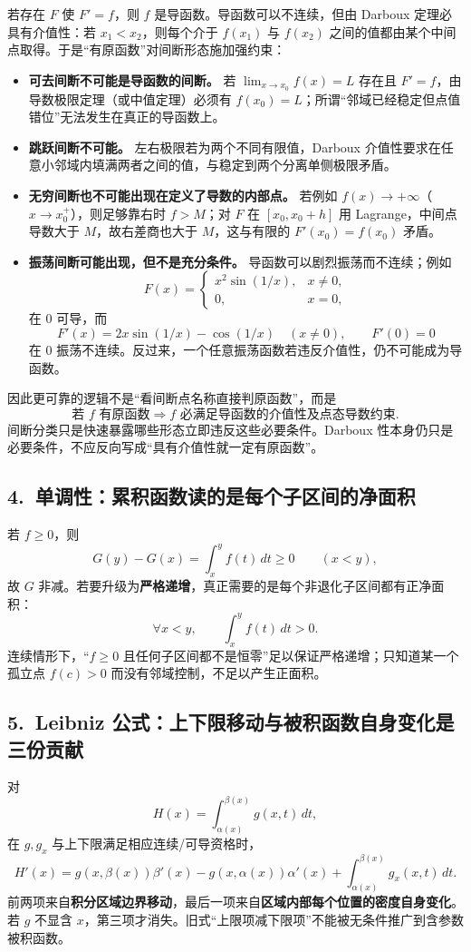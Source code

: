 \documentclass[UTF8,a4paper,10pt]{ctexart}
\begin{document}
若存在 $F$ 使 $F'=f$，则 $f$ 是导函数。导函数可以不连续，但由 Darboux 定理必具有介值性：若 $x_1<x_2$，则每个介于 $f(x_1)$ 与 $f(x_2)$ 之间的值都由某个中间点取得。于是“有原函数”对间断形态施加强约束：
\begin{itemize}
  \item \textbf{可去间断不可能是导函数的间断。} 若 $\lim_{x\to x_0}f(x)=L$ 存在且 $F'=f$，由导数极限定理（或中值定理）必须有 $f(x_0)=L$；所谓“邻域已经稳定但点值错位”无法发生在真正的导函数上。
  \item \textbf{跳跃间断不可能。} 左右极限若为两个不同有限值，Darboux 介值性要求在任意小邻域内填满两者之间的值，与稳定到两个分离单侧极限矛盾。
  \item \textbf{无穷间断也不可能出现在定义了导数的内部点。} 若例如 $f(x)\to+\infty$（$x\to x_0^+$），则足够靠右时 $f>M$；对 $F$ 在 $[x_0,x_0+h]$ 用 Lagrange，中间点导数大于 $M$，故右差商也大于 $M$，这与有限的 $F'(x_0)=f(x_0)$ 矛盾。
  \item \textbf{振荡间断可能出现，但不是充分条件。} 导函数可以剧烈振荡而不连续；例如
  \[
  F(x)=\begin{cases}x^2\sin(1/x),&x\ne0,\\0,&x=0,\end{cases}
  \]
  在 $0$ 可导，而
  \[
  F'(x)=2x\sin(1/x)-\cos(1/x)\quad(x\ne0),\qquad F'(0)=0
  \]
  在 $0$ 振荡不连续。反过来，一个任意振荡函数若违反介值性，仍不可能成为导函数。
\end{itemize}

因此更可靠的逻辑不是“看间断点名称直接判原函数”，而是
\[
\boxed{\text{若 }f\text{ 有原函数}\Longrightarrow f\text{ 必满足导函数的介值性及点态导数约束}.}
\]
间断分类只是快速暴露哪些形态立即违反这些必要条件。Darboux 性本身仍只是必要条件，不应反向写成“具有介值性就一定有原函数”。

\subsection*{4.\ 单调性：累积函数读的是每个子区间的净面积}
若 $f\ge0$，则
\[
G(y)-G(x)=\int_x^y f(t)\,dt\ge0\qquad(x<y),
\]
故 $G$ 非减。若要升级为\textbf{严格递增}，真正需要的是每个非退化子区间都有正净面积：
\[
\forall x<y,\qquad \int_x^y f(t)\,dt>0.
\]
连续情形下，“$f\ge0$ 且任何子区间都不是恒零”足以保证严格递增；只知道某一个孤立点 $f(c)>0$ 而没有邻域控制，不足以产生正面积。

\subsection*{5.\ Leibniz 公式：上下限移动与被积函数自身变化是三份贡献}
对
\[
H(x)=\int_{\alpha(x)}^{\beta(x)}g(x,t)\,dt,
\]
在 $g,g_x$ 与上下限满足相应连续/可导资格时，
\[
\boxed{
H'(x)
=g(x,\beta(x))\beta'(x)
-g(x,\alpha(x))\alpha'(x)
+\int_{\alpha(x)}^{\beta(x)}g_x(x,t)\,dt
}.
\]
前两项来自\textbf{积分区域边界移动}，最后一项来自\textbf{区域内部每个位置的密度自身变化}。若 $g$ 不显含 $x$，第三项才消失。旧式“上限项减下限项”不能被无条件推广到含参数被积函数。
\end{document}
